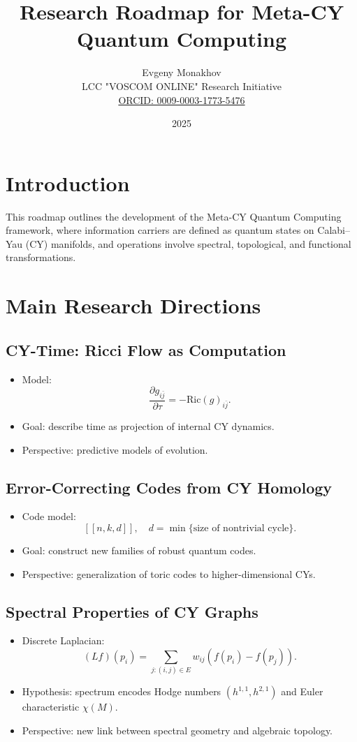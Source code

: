 \documentclass[12pt,a4paper]{article}
\title{Research Roadmap for Meta-CY Quantum Computing}
\author{Evgeny Monakhov \\ LCC "VOSCOM ONLINE" Research Initiative \\ 
\href{https://orcid.org/0009-0003-1773-5476}{ORCID: 0009-0003-1773-5476}}
\date{2025}
\begin{document}
\maketitle

\section*{Introduction}
This roadmap outlines the development of the Meta-CY Quantum Computing framework,
where information carriers are defined as quantum states on Calabi--Yau (CY) manifolds,
and operations involve spectral, topological, and functional transformations.  

\section{Main Research Directions}

\subsection{CY-Time: Ricci Flow as Computation}
\begin{itemize}
\item Model:
\[
\frac{\partial g_{i\bar{j}}}{\partial \tau} = - \mathrm{Ric}(g)_{i\bar{j}}.
\]
\item Goal: describe time as projection of internal CY dynamics.  
\item Perspective: predictive models of evolution.  
\end{itemize}

\subsection{Error-Correcting Codes from CY Homology}
\begin{itemize}
\item Code model:
\[
[[n,k,d]], \quad d = \min\{\text{size of nontrivial cycle}\}.
\]
\item Goal: construct new families of robust quantum codes.  
\item Perspective: generalization of toric codes to higher-dimensional CYs.  
\end{itemize}

\subsection{Spectral Properties of CY Graphs}
\begin{itemize}
\item Discrete Laplacian:
\[
(Lf)(p_i) = \sum_{j:(i,j)\in E} w_{ij}(f(p_i)-f(p_j)).
\]
\item Hypothesis: spectrum encodes Hodge numbers $(h^{1,1},h^{2,1})$ and Euler characteristic $\chi(M)$.  
\item Perspective: new link between spectral geometry and algebraic topology.  
\end{itemize}
\end{document}

